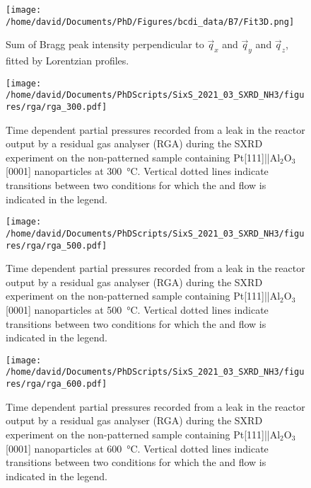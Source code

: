 \begin{figure}[!htb]
    \centering
    \texttt{[image: /home/david/Documents/PhD/Figures/bcdi\_data/B7/Fit3D.png]}
    \caption{
        Sum of Bragg peak intensity perpendicular to $\vec{q}_x$ and $\vec{q}_y$ and $\vec{q}_z$, fitted by Lorentzian profiles.
    }
    \label{fig:FitB73D}
\end{figure}


\begin{figure}[!htb]
    \centering
    \texttt{[image: /home/david/Documents/PhDScripts/SixS\_2021\_03\_SXRD\_NH3/figures/rga/rga\_300.pdf]}
    \caption{
        Time dependent partial pressures recorded from a leak in the reactor output by a residual gas analyser (RGA) during the SXRD experiment on the non-patterned sample containing Pt[111]||Al$_2$O$_3$[0001] nanoparticles at \qty{300}{\degreeCelsius}.
        Vertical dotted lines indicate transitions between two conditions for which the  and  flow is indicated in the legend.
    }
    \label{fig:RGA300SXRDNanoparticles}
\end{figure}

\begin{figure}[!htb]
    \centering
    \texttt{[image: /home/david/Documents/PhDScripts/SixS\_2021\_03\_SXRD\_NH3/figures/rga/rga\_500.pdf]}
    \caption{
        Time dependent partial pressures recorded from a leak in the reactor output by a residual gas analyser (RGA) during the SXRD experiment on the non-patterned sample containing Pt[111]||Al$_2$O$_3$[0001] nanoparticles at \qty{500}{\degreeCelsius}.
        Vertical dotted lines indicate transitions between two conditions for which the  and  flow is indicated in the legend.
    }
    \label{fig:RGA500SXRDNanoparticles}
\end{figure}

\begin{figure}[!htb]
    \centering
    \texttt{[image: /home/david/Documents/PhDScripts/SixS\_2021\_03\_SXRD\_NH3/figures/rga/rga\_600.pdf]}
    \caption{
        Time dependent partial pressures recorded from a leak in the reactor output by a residual gas analyser (RGA) during the SXRD experiment on the non-patterned sample containing Pt[111]||Al$_2$O$_3$[0001] nanoparticles at \qty{600}{\degreeCelsius}.
        Vertical dotted lines indicate transitions between two conditions for which the  and  flow is indicated in the legend.
    }
    \label{fig:RGA600SXRDNanoparticles}
\end{figure}

